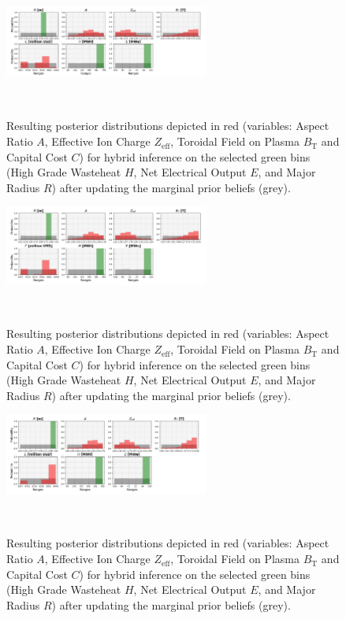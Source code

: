 \begin{figure}[ht]
    \centering
    \includegraphics[width=0.6\textwidth]{figures/TE_results/march_data/config(57)_outputs(3)_hybrid6.png}
    \caption{Resulting posterior distributions depicted in red (variables: Aspect Ratio $A$, Effective Ion Charge $Z_{\text{eff}}$, Toroidal Field on Plasma $B_{\text{T}}$ and Capital Cost $C$) for hybrid
    inference on the selected green bins (High Grade Wasteheat $H$, Net Electrical Output $E$, and Major Radius $R$) after updating the marginal prior beliefs (grey).}~\label{fig:config(57)_outputs(3)_hybrid6}
\end{figure}

\begin{figure}[ht]
    \centering
    \includegraphics[width=0.6\textwidth]{figures/TE_results/march_data/config(57)_outputs(3)_hybrid7.png}
    \caption{Resulting posterior distributions depicted in red (variables: Aspect Ratio $A$, Effective Ion Charge $Z_{\text{eff}}$, Toroidal Field on Plasma $B_{\text{T}}$ and Capital Cost $C$) for hybrid
    inference on the selected green bins (High Grade Wasteheat $H$, Net Electrical Output $E$, and Major Radius $R$) after updating the marginal prior beliefs (grey).}~\label{fig:config(57)_outputs(3)_hybrid7}
\end{figure}


\begin{figure}[ht]
    \centering
    \includegraphics[width=0.6\textwidth]{figures/TE_results/march_data/config(57)_outputs(3)_hybrid8.png}
    \caption{Resulting posterior distributions depicted in red (variables: Aspect Ratio $A$, Effective Ion Charge $Z_{\text{eff}}$, Toroidal Field on Plasma $B_{\text{T}}$ and Capital Cost $C$) for hybrid
    inference on the selected green bins (High Grade Wasteheat $H$, Net Electrical Output $E$, and Major Radius $R$) after updating the marginal prior beliefs (grey).}~\label{fig:config(57)_outputs(3)_hybrid8}
\end{figure}

